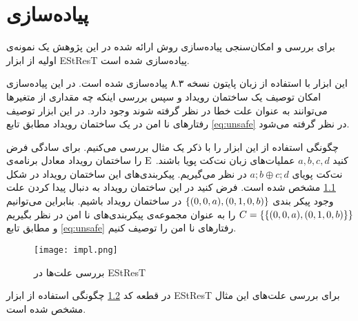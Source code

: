 \chapter{پیاده‌سازی}
برای بررسی و امکان‌سنجی پیاده‌سازی روش ارائه شده در این پژوهش
یک نمونه‌ی اولیه%
از ابزار
EStResT 
پیاده‌سازی شده است.

این ابزار با استفاده از زبان پایتون نسخه ۸.۳ پیاده‌سازی شده است.
در این پیاده‌سازی امکان توصیف یک ساختمان‌ رویداد و سپس بررسی اینکه
چه مقداری از متغیر‌ها می‌توانند به عنوان علت خطا در نظر گرفته شوند وجود دارد.
در این ابزار توصیف رفتار‌های نا امن در یک ساختمان رویداد مطابق تابع
\ref{eq:unsafe}
در نظر گرفته می‌شود.

چگونگی استفاده از این ابزار را با ذکر یک مثال بررسی می‌کنیم.
برای سادگی فرض کنید 
$a,b,c,d$
عملیات‌های زبان نت‌کت پویا باشند.
$\mathrm{E}$
را ساختمان رویداد معادل برنامه‌ی نت‌کت پویای 
$a;b \oplus c;d$
در نظر می‌گیریم.
پیکربندی‌های این ساختمان رویداد در شکل 
\ref{ex:impl:es}
مشخص شده است.
فرض کنید در این ساختمان رویداد به دنبال پیدا کردن علت
وجود پیکر بندی
$\{(0,0,a),(0,1,0,b)\}$
در ساختمان رویداد باشیم.
بنابراین می‌توانیم
$C = \left\{  \{(0,0,a),(0,1,0,b)\}\right\}$
را به عنوان مجموعه‌ی پیکر‌بندی‌های نا امن در نظر 
بگیریم و مطابق تابع
\ref{eq:unsafe}
رفتار‌های نا امن را توصیف کنیم.
\begin{figure}
    \centering
    \caption{}
    \label{ex:impl:es}
\end{figure}
\begin{figure}
    \centering
    \texttt{[image: impl.png]}
    \caption{بررسی علت‌ها در 
        EStResT 
    }
    \label{ex:impl:code}
\end{figure}
در قطعه کد 
\ref{ex:impl:code}
چگونگی استفاده از ابزار 
EStResT
برای بررسی علت‌های این مثال مشخص شده است.

